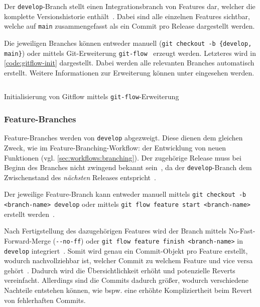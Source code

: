 Der \texttt{develop}-Branch stellt einen Integrationsbranch von Features dar, welcher die komplette Versionshistorie enthält~\cite{atlassianGitflowWorkflow}. Dabei sind alle einzelnen Features sichtbar, welche auf \texttt{main} zusammengefasst als ein Commit pro Release dargestellt werden.

Die jeweiligen Branches können entweder manuell (\texttt{git checkout -b \{develop, main\}}) oder mittels Git\hyp Erweiterung \texttt{git-flow}~\cite{driessenGitflow2012} erzeugt werden. Letzteres wird in \autoref{code:gitflow-init} dargestellt. Dabei werden alle relevanten Branches automatisch erstellt. Weitere Informationen zur Erweiterung können unter \cite{kummerGitflowcheatsheet2023} eingesehen werden.

\begin{listing}
\inputminted[breaklines]{text}{assets/code/gitflow/gitflow_init.sh}
\caption{Initialisierung von Gitflow mittels \texttt{git-flow}-Erweiterung}
\label{code:gitflow-init}
\end{listing}


\subsubsection{Feature-Branches}

Feature\hyp Branches werden von \texttt{develop} abgezweigt. Diese dienen dem gleichen Zweck, wie im Feature\hyp Branching\hyp Workflow: der Entwicklung von neuen Funktionen (vgl. \autoref{sec:workflows:branching}). Der zugehörige Release muss bei Beginn des Branches nicht zwingend bekannt sein~\cite{driessenSuccessfulGitBranching2010}, da der \texttt{develop}\hyp Branch dem Zwischenstand des \emph{nächsten} Releases entspricht~\cite{atlassianGitflowWorkflow}.

Der jeweilige Feature\hyp Branch kann entweder manuell mittels \texttt{git checkout -b <branch-name> develop} oder mittels \texttt{git flow feature start <branch-name>} erstellt werden~\cite{driessenGitflow2012}.

Nach Fertigstellung des dazugehörigen Features wird der Branch mittels No\hyp Fast\hyp Forward\hyp Merge (\verb|--no-ff|) oder \texttt{git flow feature finish <branch-name>} in \texttt{develop} integriert~\cite{driessenSuccessfulGitBranching2010,driessenGitflow2012}. Somit wird genau ein Commit\hyp Objekt pro Feature erstellt, wodurch nachvollziehbar ist, welcher Commit zu welchem Feature und vice versa gehört~\cite{driessenSuccessfulGitBranching2010}. Dadurch wird die Übersichtlichkeit erhöht und potenzielle Reverts vereinfacht. Allerdings sind die Commits dadurch größer, wodurch verschiedene Nachteile entstehen können, wie bspw. eine erhöhte Kompliziertheit beim Revert von fehlerhaften Commits.


